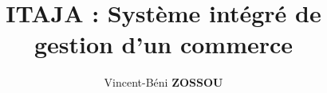 \documentclass[xcolor=dvipsnames]{beamer}
\title[ITAJA : Système intégré de gestion d’un commerce]{ITAJA : Système intégré de gestion d’un commerce}
\author{Vincent-Béni \textbf{ZOSSOU}}
\begin{document}
 
  \begin{frame}
    \titlepage
  \end{frame}
\end{document}

